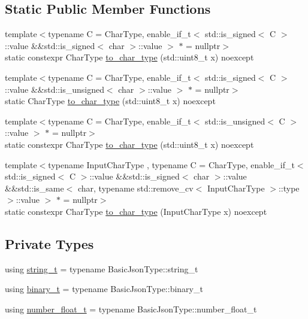 \subsection*{Static Public Member Functions}
\begin{DoxyCompactItemize}
\item 
{\footnotesize template$<$typename C  = Char\+Type, enable\+\_\+if\+\_\+t$<$ std\+::is\+\_\+signed$<$ C $>$\+::value \&\&std\+::is\+\_\+signed$<$ char $>$\+::value $>$ $\ast$  = nullptr$>$ }\\static constexpr Char\+Type \hyperlink{classnlohmann_1_1detail_1_1binary__writer_ab77aa48692bd4e64e4f051ce6aeb6d2d}{to\+\_\+char\+\_\+type} (std\+::uint8\+\_\+t x) noexcept
\item 
{\footnotesize template$<$typename C  = Char\+Type, enable\+\_\+if\+\_\+t$<$ std\+::is\+\_\+signed$<$ C $>$\+::value \&\&std\+::is\+\_\+unsigned$<$ char $>$\+::value $>$ $\ast$  = nullptr$>$ }\\static Char\+Type \hyperlink{classnlohmann_1_1detail_1_1binary__writer_a5e46f0dd3550901b15cf85265808d1ec}{to\+\_\+char\+\_\+type} (std\+::uint8\+\_\+t x) noexcept
\item 
{\footnotesize template$<$typename C  = Char\+Type, enable\+\_\+if\+\_\+t$<$ std\+::is\+\_\+unsigned$<$ C $>$\+::value $>$ $\ast$  = nullptr$>$ }\\static constexpr Char\+Type \hyperlink{classnlohmann_1_1detail_1_1binary__writer_ab77aa48692bd4e64e4f051ce6aeb6d2d}{to\+\_\+char\+\_\+type} (std\+::uint8\+\_\+t x) noexcept
\item 
{\footnotesize template$<$typename Input\+Char\+Type , typename C  = Char\+Type, enable\+\_\+if\+\_\+t$<$ std\+::is\+\_\+signed$<$ C $>$\+::value \&\&std\+::is\+\_\+signed$<$ char $>$\+::value \&\&std\+::is\+\_\+same$<$ char, typename std\+::remove\+\_\+cv$<$ Input\+Char\+Type $>$\+::type $>$\+::value $>$ $\ast$  = nullptr$>$ }\\static constexpr Char\+Type \hyperlink{classnlohmann_1_1detail_1_1binary__writer_a2c2b2132ce56b3b45593374b622baa67}{to\+\_\+char\+\_\+type} (Input\+Char\+Type x) noexcept
\end{DoxyCompactItemize}
\subsection*{Private Types}
\begin{DoxyCompactItemize}
\item 
using \hyperlink{classnlohmann_1_1detail_1_1binary__writer_a29f2ae7a5c4a8c1dae47b3b2310de8a8}{string\+\_\+t} = typename Basic\+Json\+Type\+::string\+\_\+t
\item 
using \hyperlink{classnlohmann_1_1detail_1_1binary__writer_a3169b4f7abb773ea30348770629c53e8}{binary\+\_\+t} = typename Basic\+Json\+Type\+::binary\+\_\+t
\item 
using \hyperlink{classnlohmann_1_1detail_1_1binary__writer_abb4b7c621d0cb7633b5806c603f3c51a}{number\+\_\+float\+\_\+t} = typename Basic\+Json\+Type\+::number\+\_\+float\+\_\+t
\end{DoxyCompactItemize}
